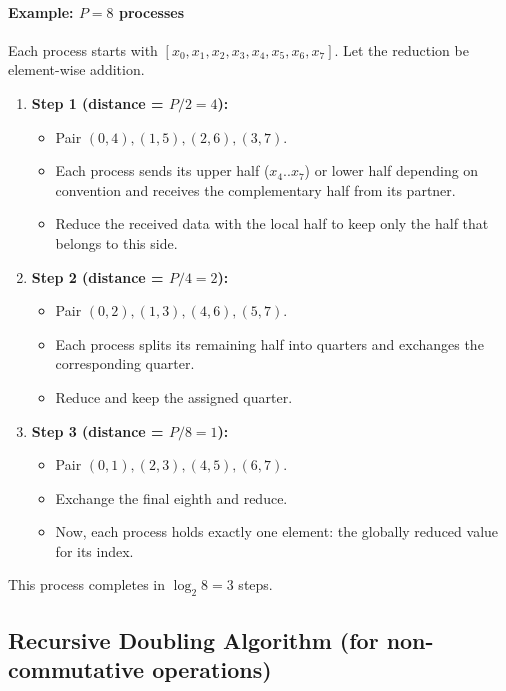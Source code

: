 \documentclass[12pt]{book}
\begin{document}
\paragraph{Example: $P=8$ processes}
Each process starts with $[x_0, x_1, x_2, x_3, x_4, x_5, x_6, x_7]$.
Let the reduction be element-wise addition.

\begin{enumerate}
  \item \textbf{Step 1 (distance = $P/2 = 4$):}
  \begin{itemize}
    \item Pair $(0,4), (1,5), (2,6), (3,7)$.
    \item Each process sends its upper half ($x_4..x_7$) or lower half depending on convention and receives the complementary half from its partner.
    \item Reduce the received data with the local half to keep only the half that belongs to this side.
  \end{itemize}

  \item \textbf{Step 2 (distance = $P/4 = 2$):}
  \begin{itemize}
    \item Pair $(0,2), (1,3), (4,6), (5,7)$.
    \item Each process splits its remaining half into quarters and exchanges the corresponding quarter.
    \item Reduce and keep the assigned quarter.
  \end{itemize}

  \item \textbf{Step 3 (distance = $P/8 = 1$):}
  \begin{itemize}
    \item Pair $(0,1), (2,3), (4,5), (6,7)$.
    \item Exchange the final eighth and reduce.
    \item Now, each process holds exactly one element: the globally reduced value for its index.
  \end{itemize}
\end{enumerate}

This process completes in $\log_2 8 = 3$ steps.


\subsection*{Recursive Doubling Algorithm (for non-commutative operations)}
\end{document}
